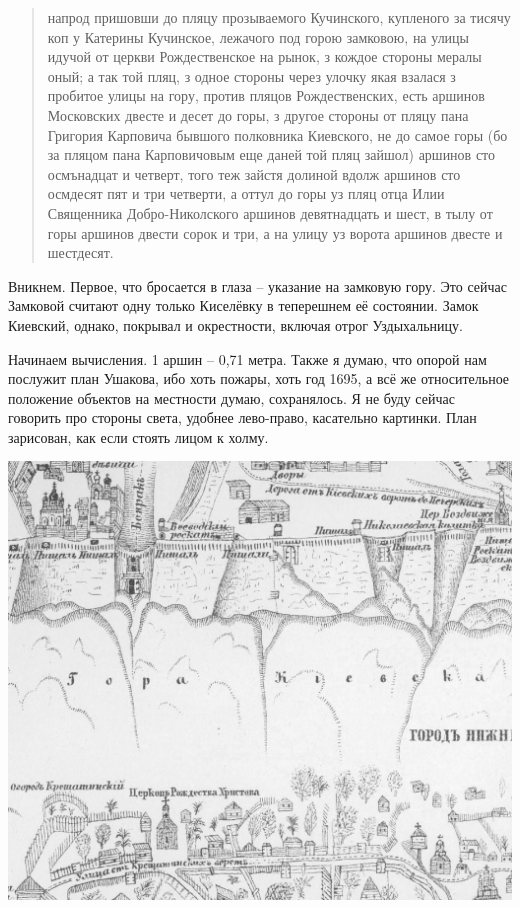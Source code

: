 \begin{quotation}
напрод пришовши до пляцу прозываемого Кучинского, купленого за тисячу коп у Катерины Кучинское, лежачого под горою замковою, на улицы идучой от церкви Рождественское на рынок, з кождое стороны мералы оный; а так той пляц, з одное стороны через улочку якая взалася з пробитое улицы на гору, против пляцов Рождественских, есть аршинов Московских двесте и десет до горы, з другое стороны от пляцу пана Григория Карповича бывшого полковника Киевского, не до самое горы (бо за пляцом пана Карповичовым еще даней той пляц зайшол) аршинов сто осмънадцат и четверт, того теж зайстя долиной вдолж аршинов сто осмдесят пят и три четверти, а оттул до горы уз пляц отца Илии Священника Добро-Николского аршинов девятнадцать и шест, в тылу от горы аршинов двести сорок и три, а на улицу уз ворота аршинов двесте и шестдесят.
\end{quotation}

Вникнем. Первое, что бросается в глаза – указание на замковую гору. Это сейчас Замковой считают одну только Киселёвку в теперешнем её состоянии. Замок Киевский, однако, покрывал и окрестности, включая отрог Уздыхальницу.

Начинаем вычисления. 1 аршин – 0,71 метра. Также я думаю, что опорой нам послужит план Ушакова, ибо хоть пожары, хоть год 1695, а всё же относительное положение объектов на местности думаю, сохранялось. Я не буду сейчас говорить про стороны света, удобнее лево-право, касательно картинки. План зарисован, как если стоять лицом к холму.


\begin{center}
\includegraphics[width=\linewidth]{chast-colebanie-osnov/borichev-tok/1695-kuch.jpg}
\end{center}

